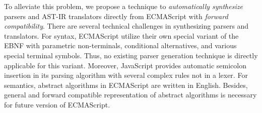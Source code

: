 To alleviate this problem, we propose a technique to \textit{automatically
synthesize} parsers and AST-IR translators directly from ECMAScript with
\textit{forward compatibility}. There are several technical challenges in
synthesizing parsers and translators. For syntax, ECMAScript utilize their own
special variant of the EBNF with parametric non-terminals, conditional
alternatives, and various special terminal symbols.  Thus, no existing parser
generation technique is directly applicable for this variant.  Moreover,
JavaScript provides automatic semicolon insertion in its parsing algorithm with
several complex rules not in a lexer. For semantics, abstract algorithms in
ECMAScript are written in English.  Besides, general and forward compatible
representation of abstract algorithms is necessary for future version of
ECMAScript.


